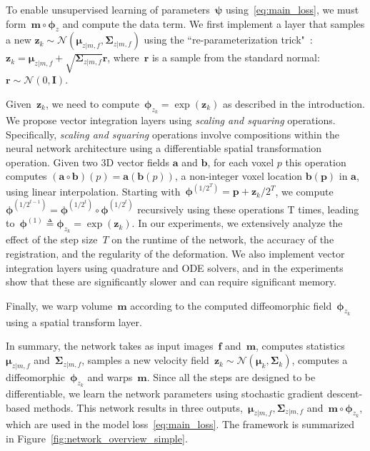 \documentclass{article}
\newcommand{\bI}{\boldsymbol{I}}
\newcommand{\bp}{\boldsymbol{p}}
\newcommand{\br}{\boldsymbol{r}}
\newcommand{\ba}{\boldsymbol{a}}
\newcommand{\bb}{\boldsymbol{b}}
\newcommand{\bmu}{\boldsymbol{\mu}}
\newcommand{\bphi}{\boldsymbol{\phi}}
\newcommand{\bpsi}{\boldsymbol{\psi}}
\newcommand{\bSigma}{\boldsymbol{\Sigma}}
\newcommand{\bz}{\boldsymbol{z}}
\newcommand{\bmoving}{\boldsymbol{m}}
\newcommand{\bfixed}{\boldsymbol{f}}
\newcommand{\moving}{m}
\newcommand{\fixed}{f}
\newcommand{\citep}{\cite}
\begin{document}
To enable unsupervised learning of parameters~$\bpsi$ using~\eqref{eq:main_loss}, we must form~\mbox{$\bmoving \circ \bphi_z$} and compute the data term. We first implement a layer that samples a new \mbox{$\bz_k \sim \mathcal{N}(\bmu_{z|\moving,\fixed}, \bSigma_{z|\moving,\fixed})$} using the ``re-parameterization trick"~\citep{kingma2013}: $\bz_k = \bmu_{z | \moving, \fixed} + \sqrt{\bSigma_{z | \moving, \fixed}} \br$, where~$\br$ is a sample from the standard normal:~$\br \sim \mathcal{N}(0, \bI)$.




Given~$\bz_k$, we need to compute~\mbox{$\bphi_{z_k} = \exp(\bz_k)$} as described in the introduction. We propose vector integration layers using \emph{scaling and squaring} operations.  
Specifically, \emph{scaling and squaring} operations involve compositions within the neural network architecture using a differentiable spatial transformation operation. Given two 3D vector fields $\ba$ and $\bb$, for each voxel $p$ this operation computes $(\ba \circ \bb)(p) = \ba(\bb(p))$, a non-integer voxel location $\bb(\bp)$ in $\ba$, using linear interpolation. Starting with~$\bphi^{(1/2^T)} = \bp + \bz_k/2^T$, we compute~\mbox{$\bphi^{(1/2^{t-1})} = \bphi^{(1/2^t)} \circ \bphi^{(1/2^t)}$} recursively using these operations T times, leading to~$\bphi^{(1)} \triangleq \bphi_{z_k} = \exp(\bz_k)$. In our experiments, we extensively analyze the effect of the step size~$T$ on the runtime of the network, the accuracy of the registration, and the regularity of the deformation. We also implement vector integration layers using quadrature and ODE solvers, and in the experiments show that these are significantly slower and can require significant memory.

Finally, we warp volume~$\bmoving$ according to the computed diffeomorphic field~$\bphi_{z_k}$ using a spatial transform layer. 

In summary, the network takes as input images~$\bfixed$ and~$\bmoving$, computes statistics~$\bmu_{z|\moving,\fixed}$ and~$\bSigma_{z|\moving,\fixed}$, samples a new velocity field~$\bz_k \sim \mathcal{N}(\bmu_k, \bSigma_k)$, computes a diffeomorphic~$\bphi_{z_k}$ and warps~$\bmoving$. Since all the steps are designed to be differentiable, we  learn the network parameters using stochastic gradient descent-based methods. This network results in three outputs,~$\bmu_{z|\moving,\fixed}, \bSigma_{z|\moving,\fixed}$ and~$\bmoving \circ \bphi_{z_k}$, which are used in the model loss~\eqref{eq:main_loss}.
 The framework is summarized in Figure~\ref{fig:network_overview_simple}. 
\end{document}
